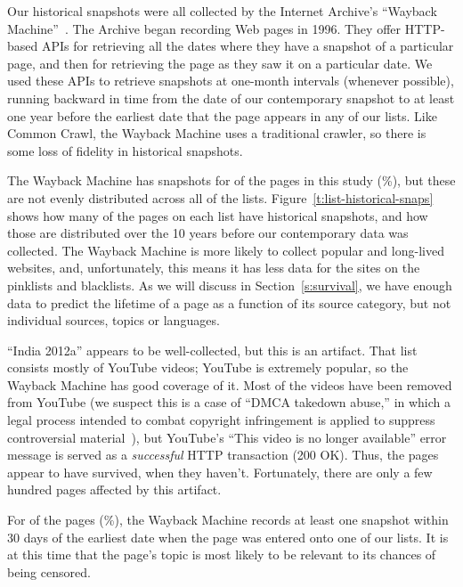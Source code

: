 Our historical snapshots were all collected by the Internet Archive's
“Wayback Machine”~\cite{ia.nd.wayback}. The Archive began recording
Web pages in 1996.  They offer HTTP-based APIs for retrieving all the
dates where they have a snapshot of a particular page, and then for
retrieving the page as they saw it on a particular date.  We used
these APIs to retrieve snapshots at one-month intervals (whenever
possible), running backward in time from the date of our contemporary
snapshot to at least one year before the earliest date that the page
appears in any of our lists.  Like Common Crawl, the Wayback Machine
uses a traditional crawler, so there is some loss of fidelity in
historical snapshots.

{\relax
%
The Wayback Machine has snapshots for \iaAvail{} of the \totalPages{}
pages in this study (\iaAvailPct{}\%), but these are not evenly
distributed across all of the lists.
Figure~\ref{t:list-historical-snaps} shows how many of the pages on
each list have historical snapshots, and how those are distributed
over the 10 years before our contemporary data was collected.  The
Wayback Machine is more likely to collect popular and long-lived
websites, and, unfortunately, this means it has less data for the
sites on the pinklists and blacklists.  As we will discuss in
Section~\ref{s:survival}, we have enough data to predict the lifetime
of a page as a function of its source category, but not individual
sources, topics or languages.

“India 2012a” appears to be well-collected, but this is an artifact.
That list consists mostly of YouTube videos; YouTube is extremely
popular, so the Wayback Machine has good coverage of it.  Most of the
videos have been removed from YouTube (we suspect this is a case of
“DMCA takedown abuse,” in which a legal process intended to combat
copyright infringement is applied to suppress controversial
material~\cite{gratz.2015.dmca}), but YouTube's “This video is no
longer available” error message is served as a \emph{successful} HTTP
transaction (200 OK).  Thus, the pages appear to have survived, when
they haven't.  Fortunately, there are only a few hundred pages
affected by this artifact.

For \iaNearLo{} of the pages (\iaNearLoPct{}\%), the Wayback Machine
records at least one snapshot within 30 days of the earliest date when
the page was entered onto one of our lists.  It is at this time that
the page's topic is most likely to be relevant to its chances of being
censored.
%
}%
